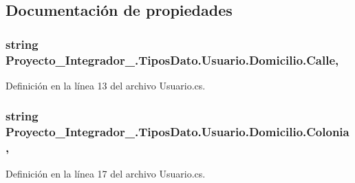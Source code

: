 \subsection{Documentación de propiedades}
\hypertarget{struct_proyecto___integrador__3_1_1_tipos_dato_1_1_usuario_1_1_domicilio_ac7f639c760a904e006a4ea6a3db05dff}{
\subsubsection[{Calle}]{\setlength{\rightskip}{0pt plus 5cm}string Proyecto\-\_\-\-Integrador\-\_.\-Tipos\-Dato.\-Usuario.\-Domicilio.\-Calle\hspace{0.3cm}{\ttfamily [get]}, {\ttfamily [set]}}}\label{struct_proyecto___integrador__3_1_1_tipos_dato_1_1_usuario_1_1_domicilio_ac7f639c760a904e006a4ea6a3db05dff}


Definición en la línea 13 del archivo Usuario.\-cs.

\hypertarget{struct_proyecto___integrador__3_1_1_tipos_dato_1_1_usuario_1_1_domicilio_a0782bc382740439c8b0340518e7ad972}{
\subsubsection[{Colonia}]{\setlength{\rightskip}{0pt plus 5cm}string Proyecto\-\_\-\-Integrador\-\_.\-Tipos\-Dato.\-Usuario.\-Domicilio.\-Colonia\hspace{0.3cm}{\ttfamily [get]}, {\ttfamily [set]}}}\label{struct_proyecto___integrador__3_1_1_tipos_dato_1_1_usuario_1_1_domicilio_a0782bc382740439c8b0340518e7ad972}


Definición en la línea 17 del archivo Usuario.\-cs.

